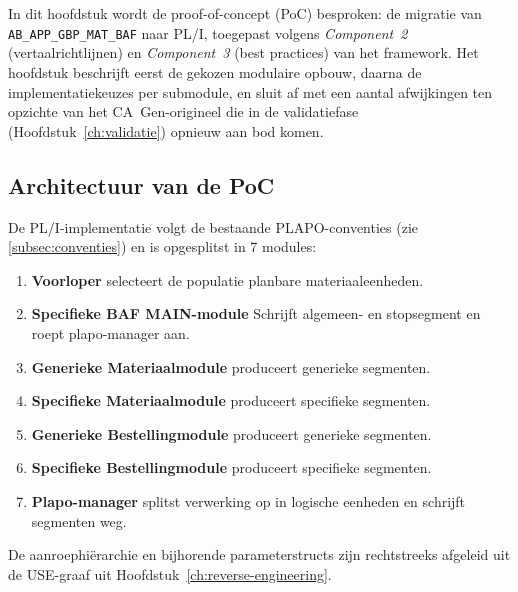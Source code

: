 
\chapter{}%
\label{ch:poc}

In dit hoofdstuk wordt de proof-of-concept (PoC) besproken: de migratie van \texttt{AB\_APP\_GBP\_MAT\_BAF} naar PL/I,
toegepast volgens \emph{Component~2} (vertaalrichtlijnen) en \emph{Component~3} (best practices) van het
framework. Het hoofdstuk beschrijft eerst de gekozen modulaire opbouw, daarna de implementatiekeuzes per
submodule, en sluit af met een aantal afwijkingen ten opzichte van het CA~Gen-origineel die in de
validatiefase (Hoofdstuk~\ref{ch:validatie}) opnieuw aan bod komen.

\section{Architectuur van de PoC}
\label{sec:poc-architectuur}

De PL/I-implementatie volgt de bestaande PLAPO-conventies (zie \autoref{subsec:conventies}) en is opgesplitst
in 7 modules:
\begin{enumerate}
    \item \textbf{Voorloper} selecteert de populatie planbare materiaaleenheden.
    \item \textbf{Specifieke BAF MAIN-module} Schrijft algemeen- en stopsegment en roept plapo-manager aan.
    \item \textbf{Generieke Materiaalmodule} produceert generieke segmenten.
    \item \textbf{Specifieke Materiaalmodule} produceert specifieke segmenten.
    \item \textbf{Generieke Bestellingmodule} produceert generieke segmenten.
    \item \textbf{Specifieke Bestellingmodule} produceert specifieke segmenten.
    \item \textbf{Plapo-manager} splitst verwerking op in logische eenheden en schrijft segmenten weg.
\end{enumerate}

De aanroephi\"erarchie en bijhorende parameterstructs zijn rechtstreeks afgeleid uit de USE-graaf uit
Hoofdstuk~\ref{ch:reverse-engineering}.


